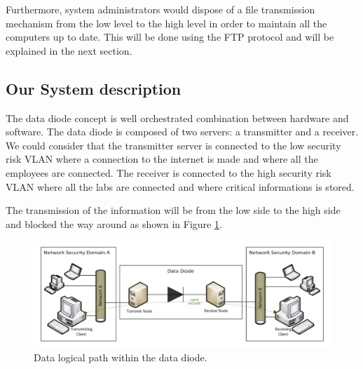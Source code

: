 \documentclass[a4paper,10pt]{article}
\begin{document}
Furthermore, system administrators would dispose of a file transmission mechanism from the low level to the high level in order to maintain all the computers up to date. This will be done using the FTP protocol and will be explained in the next section.

\subsection{Our System description}
The data diode concept is well orchestrated combination between hardware and software. The data diode is composed of two servers: a transmitter and a receiver. We could consider that the transmitter server is connected to the low security risk VLAN where a connection to the internet is made and where all the employees are connected. The receiver is connected to the high security risk VLAN where all the labs are connected and where critical informations is stored.

The transmission of the information will be from the low side to the high side and blocked the way around as shown in Figure \ref{fig:UDPDD}.

\begin{figure}
\centering
\includegraphics[scale=0.5]{images/logical-scheme-DD.png}
\caption{Data logical path within the data diode.}
\label{fig:UDPDD}
\end{figure}
\end{document}
